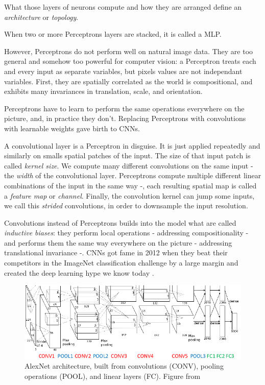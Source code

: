 What those layers of neurons compute and how they are arranged define an \emph{architecture} or \emph{topology}.

When two or more Perceptrons layers are stacked, it is called a \ac{MLP}.

However, Perceptrons do not perform well on natural image data. They are too general and somehow too powerful for computer vision: a Perceptron treats each and every input as separate variables, but pixels values are not independant variables. First, they are spatially correlated as the world is compositional, and exhibits many invariances in translation, scale, and orientation.

Perceptrons have to learn to perform the same operations everywhere on the picture, and, in practice they don't. Replacing Perceptrons with convolutions with learnable weights gave birth to \acp{CNN}.

A convolutional layer is a Perceptron in disguise. It is just applied repeatedly and similarly on smalls spatial patches of the input. The size of that input patch is called \emph{kernel size}. We compute many different convolutions on the same input - the \emph{width} of the convolutional layer. Perceptrons compute multiple different linear combinations of the input in the same way -, each resulting spatial map is called a \emph{feature map} or \emph{channel}. Finally, the convolution kernel can jump some inputs, we call this \emph{strided} convolutions, in order to downsample the input resolution.

Convolutions instead of Perceptrons builds into the model what are called \emph{inductive biases}: they perform local operations - addressing compositionality - and performs them the same way everywhere on the picture - addressing translational invariance -. \acp{CNN} got fame in 2012 when they beat their competitors in the ImageNet classification challenge by a large margin and created the deep learning hype we know today \citep{alexnet}.

\begin{figure}[t]
    \centering
    \includegraphics[scale=0.5]{30-activity/AlexNet.png}
    \caption{AlexNet architecture, built from convolutions (CONV), pooling operations (POOL), and linear layers (FC). Figure from \citet{alexnet}}
    \label{fig:alexnet}
\end{figure}

